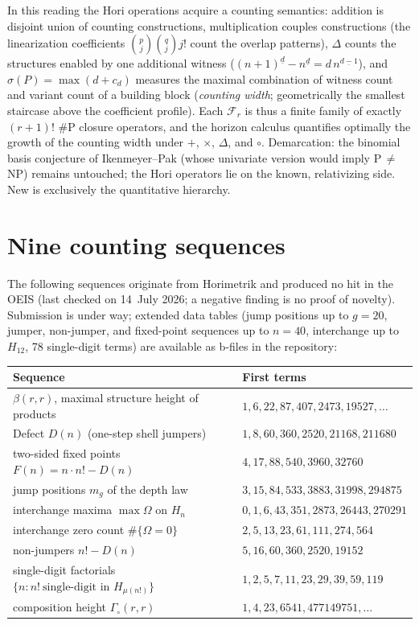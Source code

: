 \documentclass[11pt]{article}
\theoremstyle{definition}
\theoremstyle{remark}
\begin{document}
In this reading the Hori operations acquire a counting semantics:
addition is disjoint union of counting constructions,
multiplication couples constructions (the linearization
coefficients $\binom pj\binom qj j!$ count the overlap patterns),
$\Delta$ counts the structures enabled by one additional witness
($(n{+}1)^{\underline d}-n^{\underline d}=d\,n^{\underline{d-1}}$),
and $\sigma(P)=\max(d+c_d)$ measures the maximal combination of
witness count and variant count of a building block
(\emph{counting width}; geometrically the smallest staircase above
the coefficient profile). Each $\mathcal F_r$ is thus a finite
family of exactly $(r{+}1)!$ \#P closure operators, and the horizon
calculus quantifies optimally the growth of the counting width
under $+$, $\times$, $\Delta$, and $\circ$. Demarcation: the
binomial basis conjecture of Ikenmeyer--Pak (whose univariate
version would imply P$\,\ne\,$NP) remains untouched; the Hori
operators lie on the known, relativizing side.
New is exclusively the quantitative hierarchy.

\section{Nine counting sequences}

The following sequences originate from Horimetrik and produced no
hit in the OEIS (last checked on 14~July 2026; a negative finding
is no proof of novelty). Submission is under way; extended data
tables (jump positions up to $g=20$, jumper, non-jumper, and
fixed-point sequences up to $n=40$, interchange up to
$H_{12}$, 78 single-digit terms) are available as b-files in the
repository:

\begin{center}
\begin{tabular}{ll}
\toprule
Sequence & First terms\\
\midrule
$\beta(r,r)$, maximal structure height of products &
$1,6,22,87,407,2473,19527,\dots$\\
Defect $D(n)$ (one-step shell jumpers) &
$1,8,60,360,2520,21168,211680$\\
two-sided fixed points $F(n)=n\cdot n!-D(n)$ &
$4,17,88,540,3960,32760$\\
jump positions $m_g$ of the depth law &
$3,15,84,533,3883,31998,294875$\\
interchange maxima $\max\Omega$ on $H_n$ &
$0,1,6,43,351,2873,26443,270291$\\
interchange zero count $\#\{\Omega=0\}$ &
$2,5,13,23,61,111,274,564$\\
non-jumpers $n!-D(n)$ &
$5,16,60,360,2520,19152$\\
single-digit factorials $\{n: n!\ \text{single-digit in } H_{\mu(n!)}\}$ &
$1,2,5,7,11,23,29,39,59,119$\\
composition height $\Gamma_\circ(r,r)$ &
$1,4,23,6541,477149751,\dots$\\
\bottomrule
\end{tabular}
\end{center}
\end{document}
